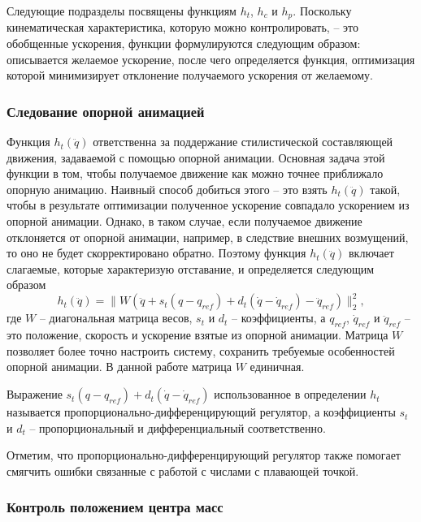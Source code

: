 Следующие подразделы посвящены функциям $h_{t}$, $h_{c}$ и $h_{p}$. Поскольку кинематическая характеристика, которую можно контролировать, -- это обобщенные ускорения, функции формулируются следующим образом: описывается желаемое ускорение, после чего определяется функция, оптимизация которой минимизирует отклонение получаемого ускорения от желаемому.

\subsubsection{Следование опорной анимацией}

Функция $h_{t}(\ddot{q})$ ответственна за поддержание стилистической составляющей движения, задаваемой с помощью опорной анимации. Основная задача этой функции в том, чтобы получаемое движение как можно точнее приближало опорную анимацию. Наивный способ добиться этого -- это взять $h_{t}(\ddot{q})$ такой, чтобы в результате оптимизации полученное ускорение совпадало ускорением из опорной анимации. Однако, в таком случае, если получаемое движение отклоняется от опорной анимации, например, в следствие внешних возмущений, то оно не будет скорректировано обратно. Поэтому функция $h_{t}(\ddot{q})$ включает слагаемые, которые характеризую отставание, и определяется следующим образом
\begin{equation*}
  h_{t}(\ddot{q}) = \lVert W (\ddot{q} + s_{t} (q - q_{ref}) + d_{t} (\dot{q} - \dot{q}_{ref}) - \ddot{q}_{ref}) \rVert_{2}^{2},
\end{equation*}
где $W$ -- диагональная матрица весов, $s_{t}$ и $d_{t}$ -- коэффициенты, а $q_{ref}$, $\dot{q}_{ref}$ и $\ddot{q}_{ref}$ -- это положение, скорость и ускорение взятые из опорной анимации. Матрица $W$ позволяет более точно настроить систему, сохранить требуемые особенностей опорной анимации. В данной работе матрица $W$ единичная.

Выражение $s_{t} (q - q_{ref}) + d_{t} (\dot{q} - \dot{q}_{ref})$ использованное в определении $h_{t}$ называется \break пропорционально-дифференцирующий регулятор, а коэффициенты $s_{t}$ и $d_{t}$ -- пропорциональный и дифференциальный соответственно.

Отметим, что пропорционально-дифференцирующий регулятор также помогает смягчить ошибки связанные с работой с числами с плавающей точкой.

\subsubsection{Контроль положением центра масс}

